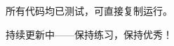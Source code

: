 \documentclass[12pt,a4paper]{ctexart}
\begin{document}
		\vspace{2cm}
		
		\begin{center}
			\textcolor{mid}{\Large 所有代码均已测试，可直接复制运行。}
		\end{center}
		
		\begin{center}
			\textcolor{mid}{持续更新中——保持练习，保持优秀！}
		\end{center}
		
\end{document}
